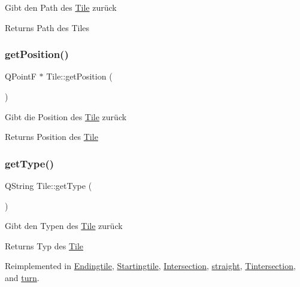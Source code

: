 Gibt den Path des \mbox{\hyperlink{class_tile}{Tile}} zurück \begin{DoxyReturn}{Returns}
Path des Tiles 
\end{DoxyReturn}
\mbox{\label{class_tile_a8c2b6c2dfd8b381932454752558b1395}} 
\subsubsection{\texorpdfstring{get\+Position()}{getPosition()}}
{\footnotesize\ttfamily Q\+PointF $\ast$ Tile\+::get\+Position (\begin{DoxyParamCaption}{ }\end{DoxyParamCaption})}

Gibt die Position des \mbox{\hyperlink{class_tile}{Tile}} zurück \begin{DoxyReturn}{Returns}
Position des \mbox{\hyperlink{class_tile}{Tile}} 
\end{DoxyReturn}
\mbox{\label{class_tile_ad1dbea94d96060491a2dc4c7b92b31ab}} 
\subsubsection{\texorpdfstring{get\+Type()}{getType()}}
{\footnotesize\ttfamily Q\+String Tile\+::get\+Type (\begin{DoxyParamCaption}{ }\end{DoxyParamCaption})\hspace{0.3cm}{\ttfamily [virtual]}}

Gibt den Typen des \mbox{\hyperlink{class_tile}{Tile}} zurück \begin{DoxyReturn}{Returns}
Typ des \mbox{\hyperlink{class_tile}{Tile}} 
\end{DoxyReturn}


Reimplemented in \mbox{\hyperlink{class_endingtile_a1e3f8d51207bd2fcd295e88b5e037b03}{Endingtile}}, \mbox{\hyperlink{class_startingtile_af9014bd47962800743b2057b520546d7}{Startingtile}}, \mbox{\hyperlink{class_intersection_a8bed77f9049accb2dcc50c3e961f5143}{Intersection}}, \mbox{\hyperlink{classstraight_a50f5861f414dc03aa4e8947945abcd9e}{straight}}, \mbox{\hyperlink{class_tintersection_a363e657adcc349bd47ea4517feaec8df}{Tintersection}}, and \mbox{\hyperlink{classturn_aee2e0c3c195f855186f12868232b18dd}{turn}}.


